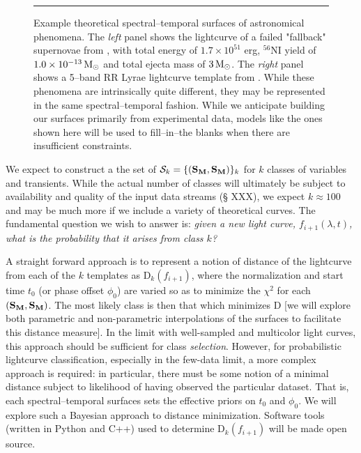 \begin{figure}[t]
\centerline{ \hfil
{}} \smallskip
\caption[]{\footnotesize Example theoretical spectral--temporal surfaces of
astronomical phenomena.  The {\it left} panel shows the lightcurve of a failed
"fallback" supernovae from \cite{2009ApJ...707..193F}, with total energy of $1.7
\times 10^{51}$ erg, $^{56}$NI yield of $1.0 \times 10^{-13} {\rm\,M_\odot}$ and total
ejecta mass of $3 {\rm\,M_\odot}$.  The {\it right} panel shows a 5--band RR Lyrae
lightcurve template from \cite{2010ApJ...708..717S}.  While these phenomena are
intrinsically quite different, they may be represented in the same
spectral--temporal fashion.  While we anticipate building our surfaces primarily
from experimental data, models like the ones shown here will be used to
fill--in--the blanks when there are insufficient constraints.} \medskip \hrule
\label{fig:sts} \end{figure}


 \smallskip

We expect to construct a the set of  ${\cal S}_k = \{({\bf S_M},{\bf S_M})\}_k$ for $k$
classes of variables and transients. While the actual number of classes will
ultimately be subject to availability and quality of the input data streams (\S
XXX), we expect $k \approx 100$ and may be much more if we include a variety of
theoretical curves. The fundamental question we wish to answer is: {\it given a
new light curve, $f_{i+1}(\lambda, t)$, what is the probability that it arises
from class $k$?}

A straight forward approach is to represent a notion of distance of the
lightcurve from each of the $k$ templates as {\cal D}$_k(f_{i+1})$, where the
normalization and start time $t_0$ (or phase offset $\phi_0$) are varied so as
to minimize the $\chi^2$ for each $({\bf S_M},{\bf S_M})$. The most likely class
is then that which minimizes {\cal D} [we will explore both parametric and
non-parametric interpolations of the surfaces to facilitate this distance
measure]. In the limit with well-sampled and multicolor light curves, this
approach should be sufficient for class {\it selection}. However, for
probabilistic lightcurve classification, especially in the few-data limit, a
more complex approach is required: in particular, there must be some notion of a
minimal distance subject to likelihood of having observed the particular
dataset. That is, each spectral–temporal surfaces sets the effective priors on
$t_0$ and $\phi_0$. We will explore such a Bayesian approach to distance
minimization. Software tools (written in Python and C++) used to determine {\cal D}$_k(f_{i+1})$ will be made open source.

